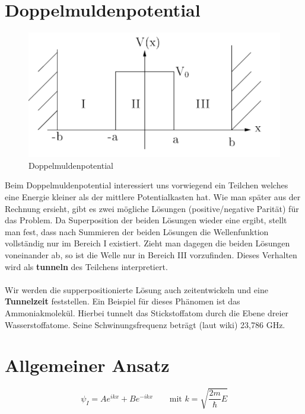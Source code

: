 



\setcounter{section}{1}
\section*{Doppelmuldenpotential}


\begin{figure}[htbp]
  \centering
  \includegraphics{./sgl_doppelmuldenpotential_pics/pic01_v.pdf}
  \caption{Doppelmuldenpotential}
  \label{fig:fg1}
\end{figure}

Beim Doppelmuldenpotential interessiert uns vorwiegend ein Teilchen welches eine Energie kleiner als der mittlere Potentialkasten hat. Wie man später aus der Rechnung ersieht, gibt es zwei mögliche Lösungen (positive/negative Parität) für das Problem. Da Superposition der beiden Lösungen wieder eine ergibt, stellt man fest, dass nach Summieren der beiden Lösungen die Wellenfunktion vollständig nur im Bereich I existiert. Zieht man dagegen die beiden Lösungen voneinander ab, so ist die Welle nur in Bereich III vorzufinden. Dieses Verhalten wird als \textbf{tunneln} des Teilchens interpretiert.\\
\\
Wir werden die supperpositionierte Lösung auch zeitentwickeln und eine \textbf{Tunnelzeit} feststellen. Ein Beispiel für dieses Phänomen ist das Ammoniakmolekül. Hierbei tunnelt das Stickstoffatom durch die Ebene dreier Wasserstoffatome. Seine Schwinungsfrequenz beträgt (laut wiki) 23,786 GHz.


\section*{Allgemeiner Ansatz}

\begin{equation}
  \label{eq:1}
  \psi_I = Ae^{ikx}+Be^{-ikx} \qquad \text{mit } k = \sqrt{\frac{2m}{\hbar}E}
\end{equation}

